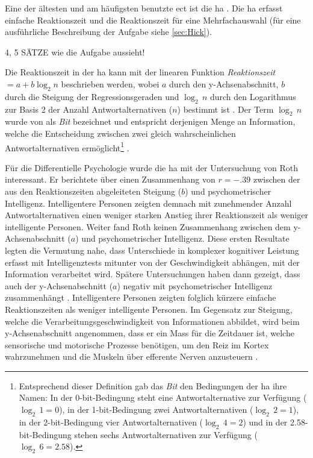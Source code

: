 \documentclass[11pt, twoside, a4paper]{book}		%
\begin{document}
Eine der ältesten und am häufigsten benutzte \gls{ect} ist die \gls{ha} \citep{Hick1952}.  Die \gls{ha} erfasst einfache Reaktionszeit und die Reaktionszeit für eine Mehrfachauswahl (für eine ausführliche Beschreibung der Aufgabe siehe \autoref{sec:Hick}). 

4, 5 SÄTZE wie die Aufgabe aussieht!

Die Reaktionszeit in der \gls{ha} kann mit der linearen Funktion \textit{Reaktionszeit}~$=a+b\log_{2}n$ beschrieben werden, wobei $a$ durch den y-Achsen\-ab\-schnitt, $b$ durch die Steigung der Regres\-sions\-geraden und $\log_{2}\,n$ durch den Logarithmus zur Basis 2 der Anzahl Antwortalternativen ($n$) bestimmt ist \citep[S. 105]{Jensen1987a}. Der Term $\log_{2}\,n$ wurde von \citet{Hick1952} als \textit{Bit} bezeichnet und entspricht derjenigen Menge an Information, welche die Entscheidung zwischen zwei gleich wahrscheinlichen Antwortalternativen ermöglicht\footnote{Entsprechend dieser Definition gab das \textit{Bit} den Bedingungen der \gls{ha} ihre Namen: In der 0-bit-Bedingung steht eine Antwortalternative zur Verfügung ($\log_{2}\,1=0$), in der 1-bit-Bedingung zwei Antwortalternativen ($\log_{2}\,2=1$), in der 2-bit-Bedingung vier Antwortalternativen ($\log_{2}\,4=2$) und in der 2.58-bit-Bedingung stehen sechs Antwortalternativen zur Verfügung ($\log_{2}\,6=2.58$).} \citep[siehe auch][S. 27]{Jensen2006}.

Für die Differentielle Psychologie wurde die \gls{ha} mit der Untersuchung von Roth \citep[1964; zitiert nach][S. 105]{Jensen1987a} interessant. Er berichtete über einen Zusammenhang von $r=-.39$ zwischen der aus den Reaktionszeiten abgeleiteten Steigung ($b$) und psychometrischer Intelligenz. Intelligentere Personen zeigten demnach mit zunehmender Anzahl Ant\-wort\-alt\-er\-na\-ti\-ven einen weniger starken Anstieg ihrer Reaktionszeit als weniger intelligente Personen. Weiter fand Roth keinen Zusammenhang zwischen dem y-Ach\-sen\-ab\-schnitt ($a$) und psychometrischer Intelligenz. Diese ersten Resultate legten die Vermutung nahe, dass Unterschiede in komplexer kognitiver Leistung erfasst mit Intelligenztests mitunter von der Geschwindigkeit abhängen, mit der Information verarbeitet wird.
Spätere Untersuchungen haben dann gezeigt, dass auch der y-Ach\-sen\-ab\-schnitt ($a$) negativ mit psychometrischer Intelligenz zusammenhängt \citep{Jensen1982b, Jensen1987a, Neubauer1997a, Neubauer1997b}. Intelligentere Personen zeigten folglich kürzere einfache Reaktionszeiten als weniger intelligente Personen. Im Gegensatz zur Steigung, welche die Verarbeitungsgeschwindigkeit von Informationen abbildet, wird beim y-Ach\-sen\-ab\-schnitt angenommen, dass er ein Mass für die Zeitdauer ist, welche sensorische und motorische Prozesse benötigen, um den Reiz im Kortex wahrzunehmen und die Muskeln über efferente Nerven anzusteuern \citep{Jensen1998a}.
\end{document}
